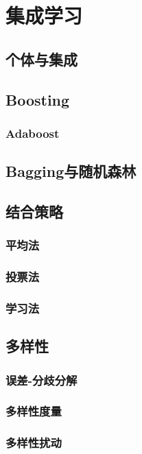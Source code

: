 \newpage
\section{集成学习}

\subsection{个体与集成}
\subsection{Boosting}
\subsubsection{Adaboost}
\subsection{Bagging与随机森林}
\subsection{结合策略}
\subsubsection{平均法}
\subsubsection{投票法}
\subsubsection{学习法}
\subsection{多样性}
\subsubsection{误差-分歧分解}
\subsubsection{多样性度量}
\subsubsection{多样性扰动}